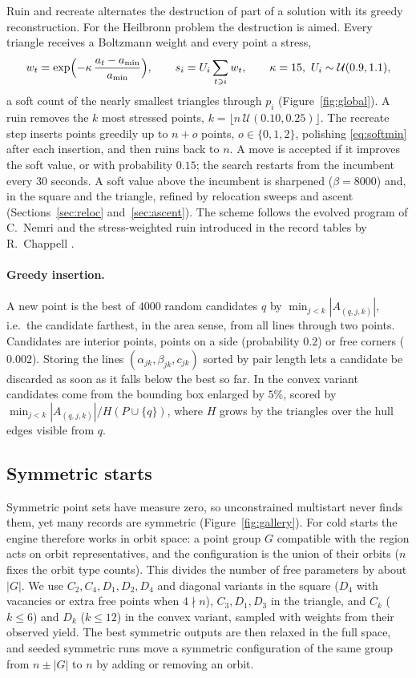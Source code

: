 \documentclass[11pt]{article}
\theoremstyle{remark}
\newcommand{\amin}{a_{\min}}
\begin{document}
Ruin and recreate \cite{RR00} alternates the destruction of part of a solution with its greedy reconstruction. For the
Heilbronn problem the destruction is aimed. Every triangle receives a Boltzmann weight and every point a stress,
\[
  w_t = \exp\Bigl(-\kappa\, \frac{a_t - \amin}{\amin}\Bigr), \qquad s_i = U_i \sum_{t \ni i} w_t, \qquad
  \kappa = 15, \ U_i \sim \mathcal{U}(0.9, 1.1),
\]
a soft count of the nearly smallest triangles through $p_i$ (Figure~\ref{fig:global}). A ruin removes the $k$ most
stressed points, $k = \lfloor n\, \mathcal{U}(0.10, 0.25) \rfloor$. The recreate step inserts points greedily up to
$n + o$ points, $o \in \{0, 1, 2\}$, polishing \eqref{eq:softmin} after each insertion, and then ruins back to $n$.
A move is accepted if it improves the soft value, or with probability $0.15$; the search restarts from the incumbent
every 30 seconds. A soft value above the incumbent is sharpened ($\beta = 8000$) and, in the square and the triangle,
refined by relocation sweeps and ascent (Sections~\ref{sec:reloc} and~\ref{sec:ascent}). The scheme follows the evolved program of
C.~Nemri \cite{cnemri} and the stress-weighted ruin introduced in the record tables by R.~Chappell \cite{HSite}.

\paragraph{Greedy insertion.} A new point is the best of $4000$ random candidates $q$ by
$\min_{j<k} |A_{(q,j,k)}|$, i.e.\ the candidate farthest, in the area sense, from all lines through two points.
Candidates are interior points, points on a side (probability $0.2$) or free corners ($0.002$). Storing the lines
$(\alpha_{jk}, \beta_{jk}, c_{jk})$ sorted by pair length lets a candidate be discarded as soon as it falls below the
best so far. In the convex variant candidates come from the bounding box enlarged by $5\%$, scored by
$\min_{j<k} |A_{(q,j,k)}| / H(P \cup \{q\})$, where $H$ grows by the triangles over the hull edges visible from $q$.

\subsection{Symmetric starts}\label{sec:sym}

Symmetric point sets have measure zero, so unconstrained multistart never finds them, yet many records are symmetric
(Figure~\ref{fig:gallery}). For cold starts the engine therefore works in orbit space: a point group $G$ compatible with
the region acts on orbit representatives, and the configuration is the union of their orbits ($n$ fixes the orbit
type counts). This divides the number of free parameters by about $|G|$. We use $C_2, C_4, D_1, D_2, D_4$ and diagonal
variants in the square ($D_4$ with vacancies or extra free points when $4 \nmid n$), $C_3, D_1, D_3$ in the triangle,
and $C_k$ ($k \le 6$) and $D_k$ ($k \le 12$) in the convex variant, sampled with weights from their observed yield. The best symmetric
outputs are then relaxed in the full space, and seeded symmetric runs move a symmetric configuration of the same group
from $n \pm |G|$ to $n$ by adding or removing an orbit.
\end{document}
